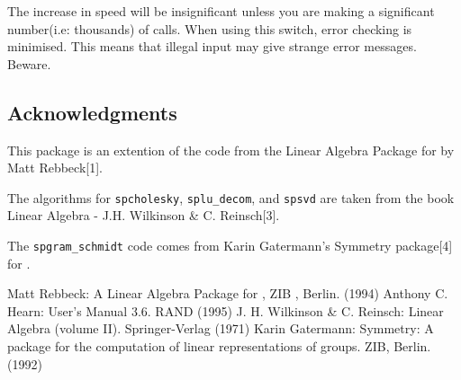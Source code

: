 The increase in speed will be insignificant unless you are making a 
significant number(i.e: thousands) of calls. When using this switch, 
error checking is minimised. This means that illegal input may give
strange error messages. Beware.

\subsection{Acknowledgments}
This package is an extention of the code from the Linear Algebra Package
for \REDUCE{} by Matt Rebbeck[1].

The algorithms for \texttt{spcholesky}, \texttt{splu\_decom}, and \texttt{spsvd} are 
taken from the book Linear Algebra - J.H. Wilkinson \& C. Reinsch[3].

The \texttt{spgram\_schmidt} code comes from Karin Gatermann's Symmetry 
package[4] for {\REDUCE}.


\begin{thebibliography}{}
 Matt Rebbeck: A Linear Algebra Package for {\REDUCE}, ZIB
, Berlin. (1994)
 Anthony C. Hearn: {\REDUCE} User's Manual 3.6.
	RAND (1995)
 J. H. Wilkinson \& C. Reinsch: Linear Algebra 
(volume II). Springer-Verlag (1971)
 Karin Gatermann: Symmetry: A {\REDUCE} package for the 
computation of linear representations of groups. ZIB, Berlin. (1992)
\end{thebibliography}
